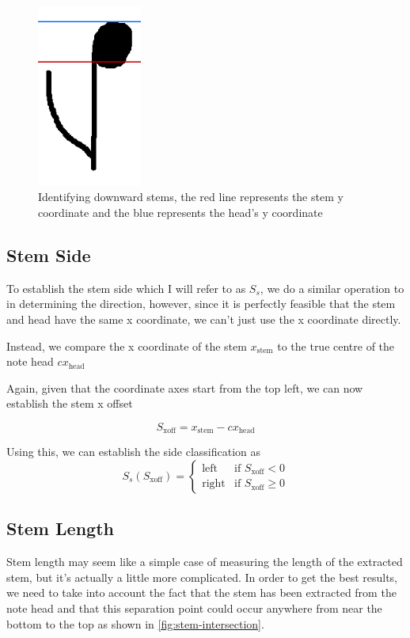 \begin{figure}[h!]
    \quad
    \includegraphics[height=6cm]{gfx/techniques/scoring/note-stem-down/6090.png}

    \caption{Identifying downward stems, the red line represents the stem y  coordinate and the blue represents the head's y coordinate}
    \label{fig:downward-stem-identification}
\end{figure}

\subsection{Stem Side}
To establish the stem side which I will refer to as $S_s$, we do a similar operation to in determining the direction, however, since it is perfectly feasible that the stem and head have the same x coordinate, we can't just use the x coordinate directly.

Instead, we compare the x coordinate of the stem $x_{\text{stem}}$ to the true centre  of the note head $cx_{\text{head}}$

Again, given that the coordinate axes start from the top left, we can now establish the stem x offset

$$
S_\text{xoff} = x_{\text{stem}} - cx_{\text{head}}
$$

Using this, we can establish the side classification as
$$
S_{s} (S_\text{xoff}) =
\left\{
	\begin{array}{ll}
		\text{left}   & \mbox{if } S_\text{xoff} < 0 \\
		\text{right}  & \mbox{if } S_\text{xoff} \ge 0
	\end{array}
\right.
$$

\subsection{Stem Length}

Stem length may seem like a simple case of measuring the length of the extracted stem, but it's actually a little more complicated. In order to get the best results, we need to take into account the fact that the stem has been extracted from the note head and that this separation point could occur anywhere from near the bottom to the top as shown in \cref{fig:stem-intersection}.

